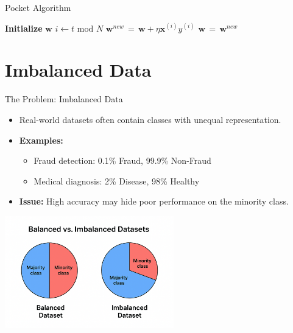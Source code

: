 \documentclass[serif, aspectratio=169]{beamer}
\begin{document}
    \begin{frame}{Pocket Algorithm}
        \begin{algorithm}[H]
            \caption{Pocket Algorithm}\label{alg:Pocket Algorithm}
            \begin{algorithmic}[1]
                \State \textbf{Initialize} $\mathbf{w}$
                    \State \(i \leftarrow t \text{ mod } N\)
                        \State \(\mathbf{w}^{new} \, = \, \mathbf{w} + \eta \mathbf{x}^{(i)}y^{(i)}\)
                         
                        \State \(\mathbf{w} \, = \, \mathbf{w}^{new}\)
                        \EndIf
                    \EndIf
                \EndFor
            \end{algorithmic}
        \end{algorithm}
    \end{frame}


    \section{Imbalanced Data}

    \begin{frame}{The Problem: Imbalanced Data}
        \begin{itemize}\itemsep1em
        \item Real-world datasets often contain classes with unequal representation.
        \item \textbf{Examples:}
        \begin{itemize}
            \item Fraud detection: 0.1\% Fraud, 99.9\% Non-Fraud
            \item Medical diagnosis: 2\% Disease, 98\% Healthy
        \end{itemize}
        \item \textbf{Issue:} High accuracy may hide poor performance on the minority class.
        \end{itemize}
        \begin{center}
            \includegraphics[width=0.55\textwidth]{pic/figure_32.png}\\
        \end{center}
    \end{frame}
\end{document}
